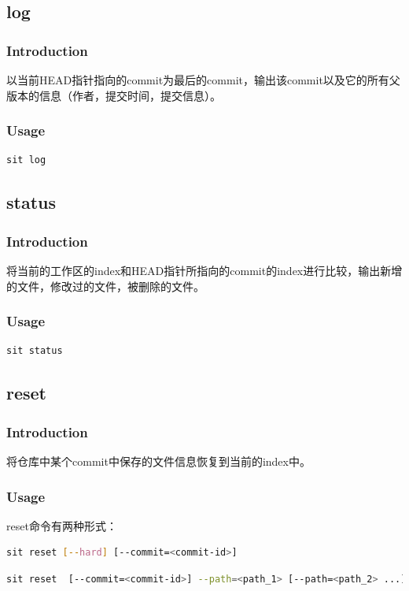 \documentclass[11pt, a4paper, UTF8]{ctexart}
\begin{document}
\subsection{log}
\subsubsection{Introduction}
以当前HEAD指针指向的commit为最后的commit，输出该commit以及它的所有父版本的信息（作者，提交时间，提交信息）。
\subsubsection{Usage}
\begin{lstlisting}[language=sh,basicstyle=\small\YaHeiMono,numbers=none]
sit log
\end{lstlisting}

\subsection{status}
\subsubsection{Introduction}
将当前的工作区的index和HEAD指针所指向的commit的index进行比较，输出新增的文件，修改过的文件，被删除的文件。
\subsubsection{Usage}
\begin{lstlisting}[language=sh,basicstyle=\small\YaHeiMono,numbers=none]
sit status
\end{lstlisting}

\subsection{reset}
\subsubsection{Introduction}
将仓库中某个commit中保存的文件信息恢复到当前的index中。
\subsubsection{Usage}
reset命令有两种形式：
\begin{lstlisting}[language=sh,basicstyle=\small\YaHeiMono,numbers=none]
sit reset [--hard] [--commit=<commit-id>]
\end{lstlisting}
\begin{lstlisting}[language=sh,basicstyle=\small\YaHeiMono,numbers=none]
sit reset  [--commit=<commit-id>] --path=<path_1> [--path=<path_2> ...]
\end{lstlisting}
\end{document}
